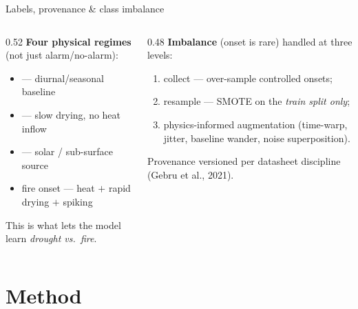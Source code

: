 \documentclass[aspectratio=169,11pt]{beamer}
\newcommand{\src}[1]{{\scriptsize\color{aegisLeaf}#1}}
\begin{document}
\begin{frame}{Labels, provenance \& class imbalance}
  \begin{columns}[T]
    \begin{column}{0.52\textwidth}
      \textbf{Four physical regimes} (not just alarm/no-alarm):
      \begin{itemize}
        \item {} — diurnal/seasonal baseline
        \item {} — slow drying, no heat inflow
        \item {} — solar / sub-surface source
        \item \alert{fire onset} — heat $+$ rapid drying $+$ spiking
      \end{itemize}
      This is what lets the model learn \emph{drought vs.\ fire}.
    \end{column}
    \begin{column}{0.48\textwidth}
      \textbf{Imbalance} (onset is rare) handled at three levels:
      \begin{enumerate}
        \item collect — over-sample controlled onsets;
        \item resample — SMOTE on the \emph{train split only};
        \item physics-informed augmentation (time-warp, jitter, baseline wander, noise superposition).
      \end{enumerate}
      \src{Provenance versioned per datasheet discipline (Gebru et al., 2021).}
    \end{column}
  \end{columns}
\end{frame}

\section{Method}
\end{document}

